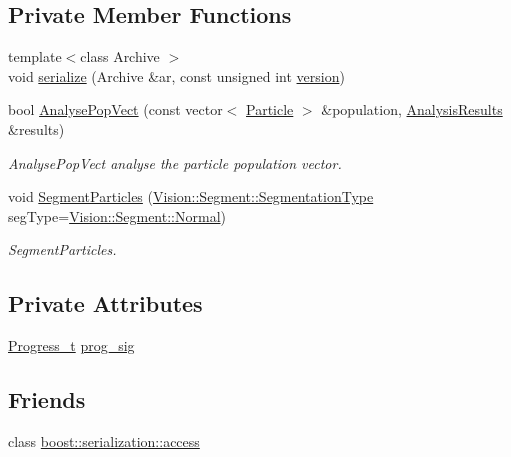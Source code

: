 \subsection*{Private Member Functions}
\begin{DoxyCompactItemize}
\item 
{\footnotesize template$<$class Archive $>$ }\\void \hyperlink{class_soil_analyzer_1_1_sample_a5be6eea7a7d74e0adec741d1e203635e}{serialize} (Archive \&ar, const unsigned int \hyperlink{class_soil_analyzer_1_1_soil_ac32132912c73338edf60b5cd6de4feb8}{version})
\item 
bool \hyperlink{class_soil_analyzer_1_1_sample_ab086f5475a5e404625b6ae1faa0fe7a2}{Analyse\+Pop\+Vect} (const vector$<$ \hyperlink{class_soil_analyzer_1_1_particle}{Particle} $>$ \&population, \hyperlink{class_soil_analyzer_1_1_analysis_results}{Analysis\+Results} \&results)
\begin{DoxyCompactList}\small\item\em Analyse\+Pop\+Vect analyse the particle population vector. \end{DoxyCompactList}\item 
void \hyperlink{class_soil_analyzer_1_1_sample_a38d665f29d94e597cb4c6a467d2e1f0b}{Segment\+Particles} (\hyperlink{class_vision_1_1_segment_af3a2b992526eac54bca53e34cf2db4da}{Vision\+::\+Segment\+::\+Segmentation\+Type} seg\+Type=\hyperlink{class_vision_1_1_segment_af3a2b992526eac54bca53e34cf2db4daae000cfc8d629752d6cdbba0d3d750184}{Vision\+::\+Segment\+::\+Normal})
\begin{DoxyCompactList}\small\item\em Segment\+Particles. \end{DoxyCompactList}\end{DoxyCompactItemize}
\subsection*{Private Attributes}
\begin{DoxyCompactItemize}
\item 
\hyperlink{class_soil_analyzer_1_1_sample_ab7b3516f36d3c9278f514b7b03621a64}{Progress\+\_\+t} \hyperlink{class_soil_analyzer_1_1_sample_aab3a7522152890650245a1f069605a13}{prog\+\_\+sig}
\end{DoxyCompactItemize}
\subsection*{Friends}
\begin{DoxyCompactItemize}
\item 
class \hyperlink{class_soil_analyzer_1_1_sample_ac98d07dd8f7b70e16ccb9a01abf56b9c}{boost\+::serialization\+::access}
\end{DoxyCompactItemize}
